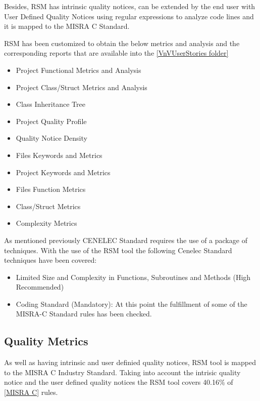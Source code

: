 Besides, RSM has intrinsic quality notices, can be extended by the end user with User Defined Quality Notices using regular expressions to analyze code lines and it is mapped to the MISRA C Standard. 

RSM has been customized to obtain the below metrics and analysis and the corresponding reports that are available into the \href{https://github.com/openETCS/validation/tree/master/VnVUserStories/VnVUserStorySQS/04-Results}{[VnVUserStories folder]}

\begin{itemize}
\item Project Functional Metrics and Analysis
\item Project Class/Struct Metrics and Analysis
\item Class Inheritance Tree
\item Project Quality Profile
\item Quality Notice Density
\item Files Keywords and Metrics
\item Project Keywords and Metrics
\item Files Function Metrics
\item Class/Struct Metrics
\item Complexity Metrics
\end{itemize}

As mentioned previously CENELEC Standard requires the use of a package of techniques. With the use of the RSM tool the following Cenelec Standard techniques have been covered:
\begin{itemize}
\item Limited Size and Complexity in Functions, Subroutines and Methods (High Recommended)
\item Coding Standard (Mandatory): At this point the fulfillment of some of the MISRA-C Standard rules has been checked.
\end{itemize}

\subsection{Quality Metrics}

As well as having intrinsic and user definied quality notices, RSM tool is mapped to the MISRA C Industry Standard. Taking into account the intrisic quality notice and the user defined quality notices the RSM tool covers 40.16\% of \href{http://msquaredtechnologies.com/m2rsm/docs/QualityStandards/MISRA_C_Mapping.htm}{[MISRA C]} rules.

